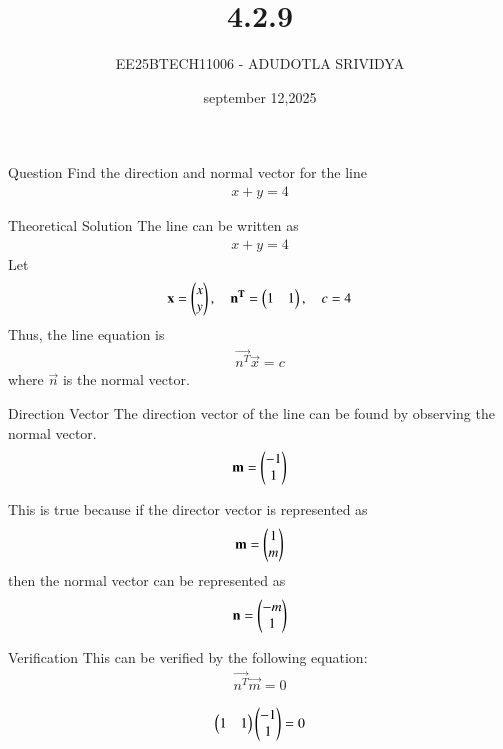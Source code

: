 \documentclass{beamer}
\title %
{4.2.9}
\date{september 12,2025}
\author %
{EE25BTECH11006 - ADUDOTLA SRIVIDYA}
\begin{document}
\frame{\titlepage}

\begin{frame}{Question}
Find the direction and normal vector for the line 
\begin{align}
    x + y = 4
\end{align}
\end{frame}

\begin{frame}{Theoretical Solution}
The line can be written as
\begin{align}
    x + y = 4
\end{align}
Let
\begin{align}
    \mathbf{x} = \begin{pmatrix}x \\ y\end{pmatrix}, \quad
    \mathbf{n^T} = \begin{pmatrix}1 & 1\end{pmatrix}, \quad
    c = 4
\end{align}
Thus, the line equation is
\begin{align}
    \vec{n^T}\vec{x} = c
\end{align}
where $\vec{n}$ is the normal vector.
\end{frame}

\begin{frame}{Direction Vector}
The direction vector of the line can be found by observing the normal vector.
\begin{align}
\mathbf{m} = \begin{pmatrix}-1 \\ 1\end{pmatrix}
\end{align}


This is true because if the director vector is represented as 
\begin{align}
\mathbf{m}  = \begin{pmatrix}1 \\ m\end{pmatrix}    
\end{align}
then the normal vector can be represented as 
\begin{align}
\mathbf{n} = \begin{pmatrix}-m \\ 1\end{pmatrix}
\end{align}
\end{frame}

\begin{frame}{Verification}
This can be verified by the following equation:
\begin{align}
\vec{n^T}\vec{m} = 0
\end{align}

\begin{align}
\begin{pmatrix}1 & 1\end{pmatrix}\begin{pmatrix}-1 \\ 1\end{pmatrix} = 0
\end{align}\\    
\end{frame}
\end{document}
